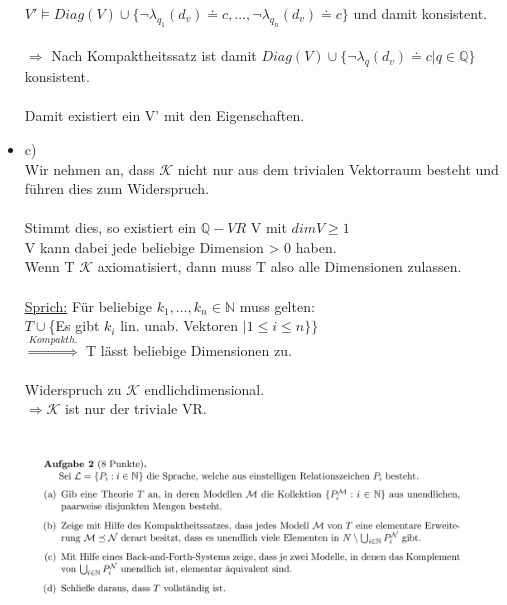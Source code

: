 \documentclass[a4paper]{scrartcl}%
\begin{document}
\begin{itemize}
            $V' \vDash Diag(V) \cup \{\neg \lambda_{q_1}(d_v) \doteq c, \dots, \neg \lambda_{q_n}(d_v) \doteq c \}$ und damit konsistent.\\
            \\$\Rightarrow$ Nach Kompaktheitssatz ist damit $Diag(V) \cup \{\neg \lambda_q(d_v) \doteq c | q \in \mathds{Q}\}$ konsistent.\\
            \\Damit existiert ein V' mit den Eigenschaften.\\
        \item c)\\
            Wir nehmen an, dass $\mathcal{K}$ nicht nur aus dem trivialen Vektorraum besteht und führen dies zum Widerspruch.\\
            \\Stimmt dies, so existiert ein $\mathds{Q}-VR$ V mit $dim V \geq 1$\\
            V kann dabei jede beliebige Dimension > 0 haben.\\
            Wenn T $\mathcal{K}$ axiomatisiert, dann muss T also alle Dimensionen zulassen.\\
            \\\underline{Sprich:} Für beliebige $k_1,\dots,k_n \in \mathds{N}$ muss gelten:\\
            $T \cup $\{Es gibt $k_i$ lin. unab. Vektoren $| 1 \leq i \leq n\}\}$\\
            $\overset{Kompakth.}{\Rightarrow}$ T lässt beliebige Dimensionen zu.\\
            \\Widerspruch zu $\mathcal{K}$ endlichdimensional.\\
            $\Rightarrow \mathcal{K}$ ist nur der triviale VR.\\ 
    \end{itemize}


\section*{}%
\label{sec:aufgabe_2}%

    \begin{figure}[H]
        \includegraphics[scale=0.3]{./A-2.png}
        \label{fig:}
    \end{figure}
\end{document}
